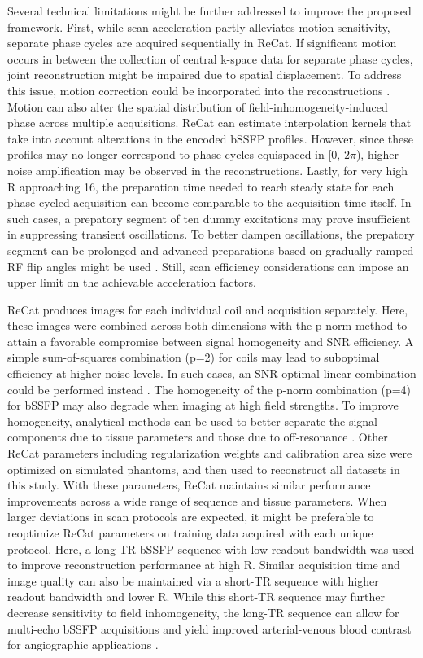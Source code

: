 \documentclass[11pt, onecolumn]{article}
\begin{document}
Several technical limitations might be further addressed to improve the proposed framework. First, while scan acceleration partly alleviates motion sensitivity, separate phase cycles are acquired sequentially in ReCat. If significant motion occurs in between the collection of central k-space data for separate phase cycles, joint reconstruction might be impaired due to spatial displacement. To address this issue, motion correction could be incorporated into the reconstructions \cite{Aksoy:2012gi}. Motion can also alter the spatial distribution of field-inhomogeneity-induced phase across multiple acquisitions. ReCat can estimate interpolation kernels that take into account alterations in the encoded bSSFP profiles. However, since these profiles may no longer correspond to phase-cycles equispaced in [0, $2\pi$), higher noise amplification may be observed in the reconstructions. Lastly, for very high R approaching 16, the preparation time needed to reach steady state for each phase-cycled acquisition can become comparable to the acquisition time itself. In such cases, a prepatory segment of ten dummy excitations may prove insufficient in suppressing transient oscillations. To better dampen oscillations, the prepatory segment can be prolonged and advanced preparations based on gradually-ramped RF flip angles might be used \cite{Hargreaves:2001vd}. Still, scan efficiency considerations can impose an upper limit on the achievable acceleration factors. 

ReCat produces images for each individual coil and acquisition separately. Here, these images were combined across both dimensions with the p-norm method to attain a favorable compromise between signal homogeneity and SNR efficiency. A simple sum-of-squares combination (p=2) for coils may lead to suboptimal efficiency at higher noise levels. In such cases, an SNR-optimal linear combination could be performed instead \cite{Cukur:2008ht}. The homogeneity of the p-norm combination (p=4) for bSSFP may also degrade when imaging at high field strengths. To improve homogeneity, analytical methods can be used to better separate the signal components due to tissue parameters and those due to off-resonance \cite{Xiang:2014gc,Bjork:2014hm}. Other ReCat parameters including regularization weights and calibration area size were optimized on simulated phantoms, and then used to reconstruct all datasets in this study. With these parameters, ReCat maintains similar performance improvements across a wide range of sequence and tissue parameters. When larger deviations in scan protocols are expected, it might be preferable to reoptimize ReCat parameters on training data acquired with each unique protocol. Here, a long-TR bSSFP sequence with low readout bandwidth was used to improve reconstruction performance at high R. Similar acquisition time and image quality can also be maintained via a short-TR sequence with higher readout bandwidth and lower R. While this short-TR sequence may further decrease sensitivity to field inhomogeneity, the long-TR sequence can allow for multi-echo bSSFP acquisitions \cite{Reeder:2005gu} and yield improved arterial-venous blood contrast for angiographic applications \cite{Cukur:2011iy}.
\end{document}
